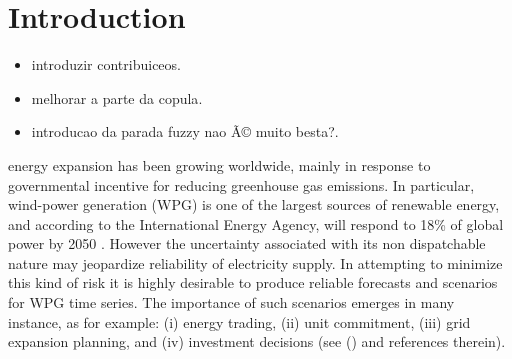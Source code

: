 \documentclass[a4paper]{IEEEtran}
\begin{document}

\section{Introduction}
\label{Introduction}

\begin{itemize}
	
	\item {\color{red} introduzir contribuiceos}.
	
	\item {\color{red} melhorar a parte da copula}.
	
	\item {\color{red} introducao da parada fuzzy nao Ã© muito besta?}.
	
\end{itemize}

 energy expansion has been growing worldwide, mainly in response to governmental incentive for reducing greenhouse gas emissions. In particular, wind-power generation (WPG) is one of the largest sources of renewable energy, and according to the International Energy Agency, will respond to 18\% of global power by 2050  \cite{IntEnerAgency}. However the uncertainty associated with its non dispatchable nature may jeopardize reliability of electricity supply. In attempting to minimize this kind of risk it is highly desirable to produce reliable forecasts and scenarios for WPG time series. The importance of such scenarios emerges in many instance, as for example: (i) energy trading, (ii) unit commitment, (iii) grid expansion planning, and (iv) investment decisions (see (\cite{moreiraStreet,jabr2013robust,zhaoguan,Aderson2017}) and references therein). 


\end{document}
